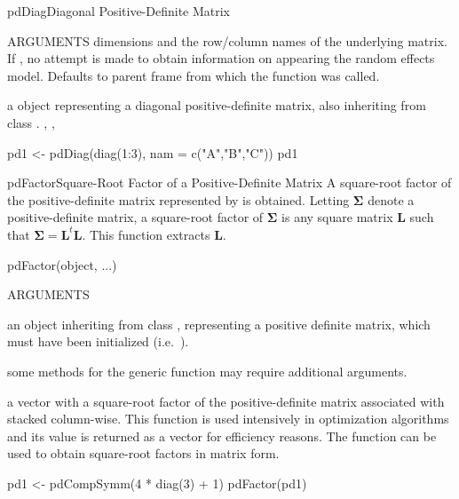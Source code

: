 \documentclass[pdftex]{article} \usepackage{url,graphicx}
\newcommand{\bm}[1]{{\boldsymbol {#1}}}
\newcommand{\bS}{\bm\Sigma}
\newcommand{\bL}{{\bm L}}
\begin{document}
\begin{Helpfile}{pdDiag}{Diagonal Positive-Definite Matrix}
\begin{Argument}{ARGUMENTS}
dimensions and the row/column names of the underlying matrix. If
, no attempt is made to obtain information on 
 appearing the random effects model. Defaults to parent
frame from which the function was called.
\end{Argument}
a  object representing a diagonal positive-definite
matrix, also inheriting from class .
, ,
\need 15pt
\vspace{-16pt} 
\begin{Example}
pd1 <- pdDiag(diag(1:3), nam = c("A","B","C"))
pd1
\end{Example}
\end{Helpfile}
\begin{Helpfile}{pdFactor}{Square-Root Factor of a Positive-Definite Matrix}
A square-root factor of the positive-definite matrix represented by
 is obtained. Letting $\bS$ denote a
positive-definite matrix, a square-root factor of $\bS$ is
any square matrix $\bL$ such that $\bS = \bL^{t}\bL$. This function
extracts $\bL$. 
\begin{Example}
pdFactor(object, ...)
\end{Example}
\begin{Argument}{ARGUMENTS}
\item[\Co{object:}]
an object inheriting from class , representing
a positive definite matrix, which must have been initialized
(i.e.\ ).
\item[\Co{...:}]
some methods for the generic function may require additional
arguments.
\end{Argument}
a vector with a square-root factor of the positive-definite matrix
associated with  stacked column-wise.
 This function is used intensively in optimization
algorithms and its value is returned as a vector for efficiency
reasons. The  function can be used to obtain
square-root factors in matrix form.
\need 15pt
\vspace{-16pt} 
\begin{Example}
pd1 <- pdCompSymm(4 * diag(3) + 1)
pdFactor(pd1)
\end{Example}
\end{Helpfile}
\end{document}
